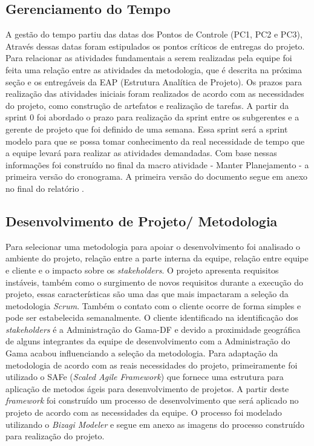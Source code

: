 \subsection{Gerenciamento do Tempo}

A gest\~ao do tempo partiu das datas dos Pontos de Controle (PC1, PC2 e PC3), Atrav\'es dessas datas foram estipulados os pontos cr\'iticos de entregas do projeto. Para relacionar as atividades fundamentais a serem realizadas pela equipe foi feita uma rela\c{c}\~ao entre as atividades da metodologia, que \'e descrita na pr\'oxima se\c{c}\~ao e os entreg\'aveis da EAP (Estrutura Anal\'itica de Projeto).
Os prazos para realiza\c{c}\~ao das atividades iniciais foram realizados de acordo com as necessidades do projeto, como constru\c{c}\~ao de artefatos e realiza\c{c}\~ao de tarefas. 
A partir da sprint 0 foi abordado o prazo para realiza\c{c}\~ao da sprint entre os subgerentes e a gerente de projeto que foi definido de uma semana. Essa sprint ser\'a a sprint modelo para que se possa tomar conhecimento da real necessidade de tempo que a equipe levar\'a para realizar as atividades demandadas. Com base nessas informa\c{c}\~oes foi constru\'ido no final da macro atividade - Manter Planejamento - a primeira vers\~ao do cronograma. A primeira vers\~ao do documento segue em anexo no final do relat\'orio .

\subsection{Desenvolvimento de Projeto/ Metodologia}

Para selecionar uma metodologia para apoiar o desenvolvimento foi analisado o ambiente do projeto, rela\c{c}\~ao entre a parte interna da equipe, rela\c{c}\~ao entre equipe e cliente e o impacto sobre os \textit{stakeholders}. 
	O projeto apresenta requisitos inst\'aveis, tamb\'em como o surgimento de novos requisitos durante a execu\c{c}\~ao do projeto, essas caracter\'isticas s\~ao uma das que mais impactaram a sele\c{c}\~ao da metodologia \textit{Scrum}. Tamb\'em o contato com o cliente ocorre de forma simples e pode ser estabelecida semanalmente. O cliente identificado na identifica\c{c}\~ao dos \textit{stakeholders} \'e a Administra\c{c}\~ao do Gama-DF e devido a proximidade geogr\'afica de alguns integrantes da equipe de desenvolvimento com a Administra\c{c}\~ao do Gama acabou influenciando a sele\c{c}\~ao da metodologia. 
Para adapta\c{c}\~ao da metodologia de acordo com as reais necessidades do projeto, primeiramente foi utilizado o SAFe (\textit{Scaled Agile Framework}) que fornece uma estrutura para aplica\c{c}\~ao de metodos \'ageis para desenvolvimento de projetos. A partir deste \textit{framework} foi constru\'ido um processo de desenvolvimento que ser\'a aplicado no projeto de acordo com as necessidades da equipe. O processo foi modelado utilizando o \textit{Bizagi Modeler} e segue em anexo  \cite{CronogramaDoProjeto} as imagens do processo constru\'ido para realiza\c{c}\~ao do projeto. 

